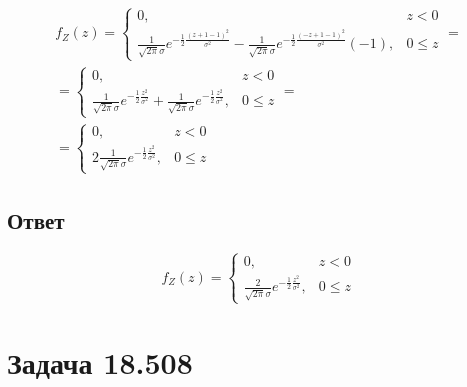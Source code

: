 \documentclass[12pt,a4paper]{article}
\begin{document}
    \begin{multline}
        f_Z(z)
        = \left \{
        \begin{array}{ll}
            0,                                                                                                                                                                                                & z < 0    \\
            \frac{1}{\sqrt{2 \pi} \sigma} e^{-\frac{1}{2} \frac{\left ( z + 1 - 1 \right )^2}{\sigma^2}} - \frac{1}{\sqrt{2 \pi} \sigma} e^{-\frac{1}{2} \frac{\left ( -z + 1 - 1 \right )^2}{\sigma^2}}(-1), & 0 \leq z
        \end{array}
        \right . = \\
        = \left \{
        \begin{array}{ll}
            0,                                                                                                                                         & z < 0    \\
            \frac{1}{\sqrt{2 \pi} \sigma} e^{-\frac{1}{2} \frac{z^2}{\sigma^2}} + \frac{1}{\sqrt{2 \pi} \sigma} e^{-\frac{1}{2} \frac{z^2}{\sigma^2}}, & 0 \leq z
        \end{array}
        \right . = \\
        = \left \{
        \begin{array}{ll}
            0,                                                                     & z < 0    \\
            2 \frac{1}{\sqrt{2 \pi} \sigma} e^{-\frac{1}{2} \frac{z^2}{\sigma^2}}, & 0 \leq z
        \end{array}
        \right .
    \end{multline}

    \subsection*{Ответ}
    $$
    f_Z(z)
    = \left \{
    \begin{array}{ll}
        0,                                                                   & z < 0    \\
        \frac{2}{\sqrt{2 \pi} \sigma} e^{-\frac{1}{2} \frac{z^2}{\sigma^2}}, & 0 \leq z
    \end{array}
    \right .
    $$


    \section{Задача 18.508}
\end{document}

